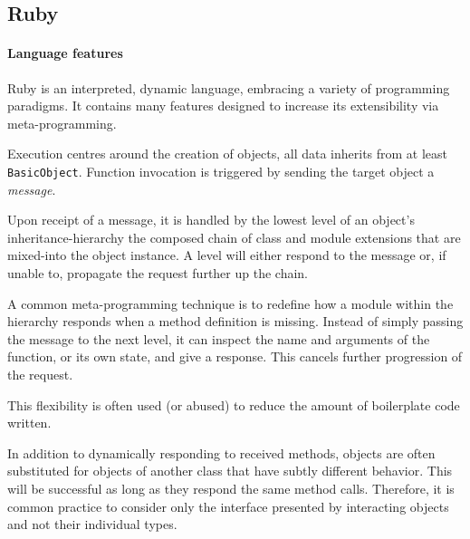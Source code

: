 \subsection{Ruby}
\paragraph*{Language features}
Ruby\cite{rubylang} is an interpreted, dynamic language, embracing a variety of programming paradigms. It contains many features designed to increase its extensibility via meta-programming.

Execution centres around the creation of objects, all data inherits from at least \verb|BasicObject|. Function invocation is triggered by sending the target object a \emph{message}.

Upon receipt of a message, it is handled by the lowest level of an object's inheritance-hierarchy \textemdash{} the composed chain of class and module extensions that are mixed-into the object instance. A level will either respond to the message or, if unable to, propagate the request further up the chain.

A common meta-programming technique is to redefine how a module within the hierarchy responds when a method definition is missing. Instead of simply passing the message to the next level, it can inspect the name and arguments of the function, or its own state, and give a response. This cancels further progression of the request.

\begin{comment}
\begin{lstlisting}[
  language=Ruby,
  label=lst:methmiss,
  caption=A toy example where an object responds to a missing method instead of propagating the message.
]
class HungryHippo
  def eat
    puts "Nom nom nom!"
  end

  def method_missing(meth, *args, &block)
    if /eat/.match meth.to_s
      puts "Eat? ok then."
      eat
    else
      super
    end
  end
end

hippo = HungryHippo.new
hippo.eat
hippo.dont_eat
# >> Nom nom nom!
# >> Eat? ok then.
# >> Nom nom nom!
\end{lstlisting}
\end{comment}

This flexibility is often used (or abused) to reduce the amount of boilerplate code written.

In addition to dynamically responding to received methods, objects are often substituted for objects of another class that have subtly different behavior. This will be successful as long as they respond the same method calls. Therefore, it is common practice to consider only the interface presented by interacting objects and not their individual types.

